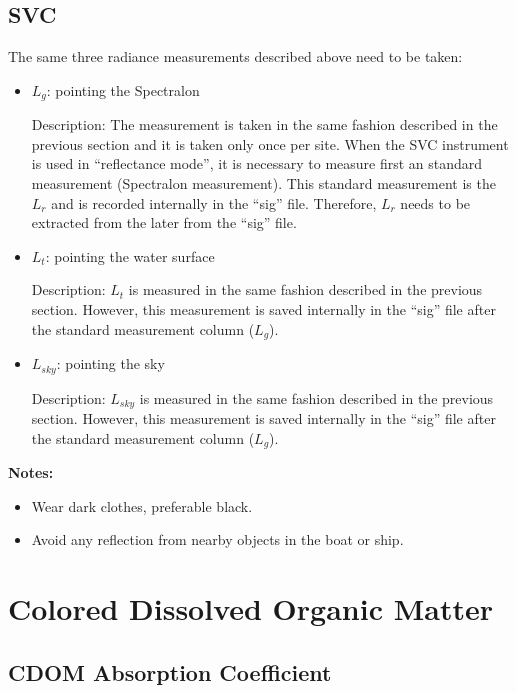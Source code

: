 \documentclass[]{spie}  %
\begin{document}
\subsection{SVC}
The same three radiance measurements described above need to be taken:

\begin{itemize}
	\item $L_g$: pointing the Spectralon

Description: The measurement is taken in the same fashion described in the previous section and it is taken only once per site. When the SVC instrument is used in ``reflectance mode'', it is necessary to measure first an standard measurement (Spectralon measurement). This standard measurement is the $L_r$ and is recorded internally in the ``sig'' file. Therefore, $L_r$ needs to be extracted from the later from the ``sig'' file. 

	\item $L_t$: pointing the water surface

Description: $L_t$ is measured in the same fashion described in the previous section. However, this measurement is saved internally in the ``sig'' file after the standard measurement column ($L_g$).

	\item $L_{sky}$: pointing the sky	

Description: $L_{sky}$ is measured in the same fashion described in the previous section. However, this measurement is saved internally in the ``sig'' file after the standard measurement column ($L_g$).

\end{itemize}
{\bf Notes:}
\begin{itemize}
	\item Wear dark clothes, preferable black.
	\item Avoid any reflection from nearby objects in the boat or ship. 
\end{itemize}
\newpage
\section{Colored Dissolved Organic Matter}
\subsection{CDOM Absorption Coefficient}
\end{document}

